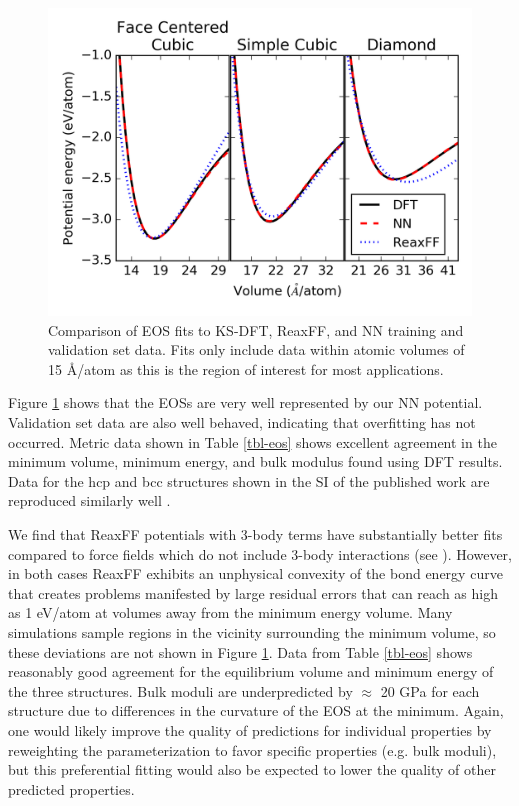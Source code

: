 \documentclass[12pt,oneside]{cmuthesis}
\begin{document}
\begin{figure}[h]
\centering
\includegraphics[width=5.5in]{./images/fig-bulk-eos.png}
\caption{\label{fig-bulk-eos}
Comparison of EOS fits to KS-DFT, ReaxFF, and NN training and validation set data. Fits only include data within atomic volumes of \textpm{} 15 \AA{}/atom as this is the region of interest for most applications.}
\end{figure}

Figure \ref{fig-bulk-eos} shows that the EOSs are very well represented by our NN potential. Validation set data are also well behaved, indicating that overfitting has not occurred. Metric data shown in Table \ref{tbl-eos} shows excellent agreement in the minimum volume, minimum energy, and bulk modulus found using DFT results. Data for the hcp and bcc structures shown in the SI of the published work are reproduced similarly well \cite{boes-2016-neural-networ}.

We find that ReaxFF potentials with 3-body terms have substantially better fits compared to force fields which do not include 3-body interactions (see \cite{keith-2010-react-forcef}). However, in both cases ReaxFF exhibits an unphysical convexity of the bond energy curve that creates problems manifested by large residual errors that can reach as high as \textpm{} 1 eV/atom at volumes away from the minimum energy volume. Many simulations sample regions in the vicinity surrounding the minimum volume, so these deviations are not shown in Figure \ref{fig-bulk-eos}. Data from Table \ref{tbl-eos} shows reasonably good agreement for the equilibrium volume and minimum energy of the three structures. Bulk moduli are underpredicted by \(\approx\) 20 GPa for each structure due to differences in the curvature of the EOS at the minimum. Again, one would likely improve the quality of predictions for individual properties by reweighting the parameterization to favor specific properties (e.g. bulk moduli), but this preferential fitting would also be expected to lower the quality of other predicted properties.
\end{document}
